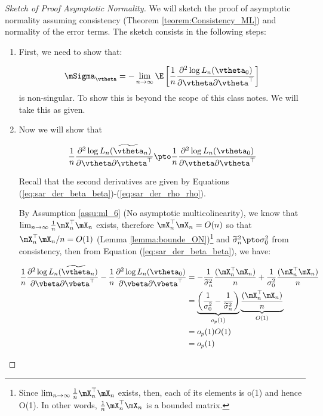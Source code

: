 \documentclass[english,12pt]{book}\usepackage[]{graphicx}\usepackage[]{xcolor}
\begin{document}
\begin{proof}[Sketch of Proof Asymptotic Normality] We will sketch the proof of asymptotic normality assuming consistency (Theorem \ref{teorem:Consistency_ML}) and normality of the error terms. The sketch consists in the following steps: 
\begin{enumerate}
  \item First, we need to show that:
  
    \begin{equation*}
    \mSigma_{\vtheta} = - \lim_{n\to\infty} \E\left[\frac{1}{n}\frac{\partial^2 \log L_n(\vtheta_0)}{\partial \vtheta \partial \vtheta^\top}\right]
    \end{equation*}
    is non-singular. To show this is beyond the scope of this class notes. We will take this as given. 
  \item Now we will show that 
  
   \begin{equation*}
    \frac{1}{n}\frac{\partial^2 \log L_n(\widetilde{\vtheta}_n)}{\partial \vtheta \partial \vtheta^\top}\pto \frac{1}{n}\frac{\partial^2 \log L_n(\vtheta_0)}{\partial \vtheta \partial \vtheta^\top}
   \end{equation*}
   
   Recall that the second derivatives are given by Equations (\ref{eq:sar_der_beta_beta})-(\ref{eq:sar_der_rho_rho}).
   
   By Assumption \ref{assu:ml_6} (No asymptotic multicolinearity), we know that  $\lim_{n\to\infty}\frac{1}{n}\mX_n^\top\mX_n$ exists, therefore $\mX_n^\top\mX_n = O(n)$ so that $\mX_n^\top\mX_n/n = O(1)$ (Lemma \ref{lemma:bounde_ON})\footnote{Since $\lim_{n\to\infty}\frac{1}{n}\mX_n^\top\mX_n$ exists, then, each of its elements is o(1) and hence O(1). In other words, $\frac{1}{n}\mX_n^\top\mX_n$ is a bounded matrix.}   and $\widetilde{\sigma}^2_n\pto \sigma_0^2$ from consistency, then from Equation (\ref{eq:sar_der_beta_beta}), we have:
   
   \begin{equation*}
    \begin{aligned}
    \frac{1}{n}\frac{\partial^2 \log L_n(\widetilde{\vtheta}_n)}{\partial \vbeta \partial \vbeta^\top} - \frac{1}{n}\frac{\partial^2 \log L_n(\vtheta_0)}{\partial \vbeta \partial \vbeta^\top} & = - \frac{1}{\widetilde{\sigma}^2_n}\frac{(\mX^\top_n \mX_n)}{n} + \frac{1}{\sigma^2_0}\frac{(\mX^\top_n \mX_n)}{n} \\
    & = \underbrace{\left(\frac{1}{\sigma^2_0} - \frac{1}{\widetilde{\sigma}^2_n}\right)}_{o_p(1)}\underbrace{\frac{(\mX^\top_n \mX_n)}{n}}_{O(1)} \\
    & = o_p(1)O(1)  \\
    & = o_p(1)
    \end{aligned}
   \end{equation*}
   

\end{enumerate}
\end{proof}
\end{document}
